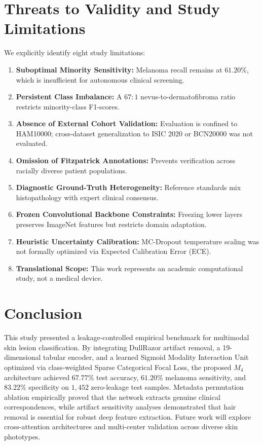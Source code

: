\documentclass[journal,10pt,twocolumn]{IEEEtran}
\begin{document}
\section{Threats to Validity and Study Limitations}
We explicitly identify eight study limitations:
\begin{enumerate}
    \item \textbf{Suboptimal Minority Sensitivity:} Melanoma recall remains at $61.20\%$, which is insufficient for autonomous clinical screening.
    \item \textbf{Persistent Class Imbalance:} A $67:1$ nevus-to-dermatofibroma ratio restricts minority-class F1-scores.
    \item \textbf{Absence of External Cohort Validation:} Evaluation is confined to HAM10000; cross-dataset generalization to ISIC 2020 or BCN20000 was not evaluated.
    \item \textbf{Omission of Fitzpatrick Annotations:} Prevents verification across racially diverse patient populations.
    \item \textbf{Diagnostic Ground-Truth Heterogeneity:} Reference standards mix histopathology with expert clinical consensus.
    \item \textbf{Frozen Convolutional Backbone Constraints:} Freezing lower layers preserves ImageNet features but restricts domain adaptation.
    \item \textbf{Heuristic Uncertainty Calibration:} MC-Dropout temperature scaling was not formally optimized via Expected Calibration Error (ECE).
    \item \textbf{Translational Scope:} This work represents an academic computational study, not a medical device.
\end{enumerate}

\section{Conclusion}
This study presented a leakage-controlled empirical benchmark for multimodal skin lesion classification. By integrating DullRazor artifact removal, a 19-dimensional tabular encoder, and a learned Sigmoid Modality Interaction Unit optimized via class-weighted Sparse Categorical Focal Loss, the proposed $M_4$ architecture achieved $67.77\%$ test accuracy, $61.20\%$ melanoma sensitivity, and $83.22\%$ specificity on $1,452$ zero-leakage test samples. Metadata permutation ablation empirically proved that the network extracts genuine clinical correspondences, while artifact sensitivity analyses demonstrated that hair removal is essential for robust deep feature extraction. Future work will explore cross-attention architectures and multi-center validation across diverse skin phototypes.



\end{document}
